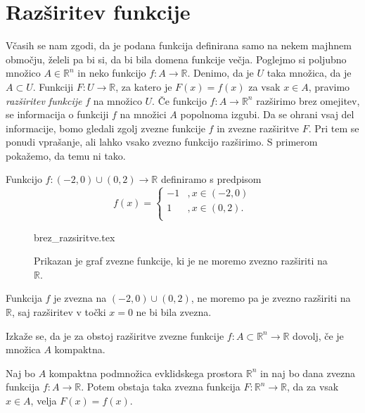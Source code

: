 \documentclass[mat1]{fmfdelo}
\newcommand{\R}{\mathbb R}
\newcommand{\0}{0}
\begin{document}
\section{Razširitev funkcije}\label{raz:siritev}
Včasih se nam zgodi, da je podana funkcija definirana samo na nekem majhnem območju, želeli pa bi si, da bi bila domena funkcije večja. Poglejmo si poljubno množico $A \in \R^n$ in neko funkcijo $f : A \to \R$. Denimo, da je $U$ taka množica, da je $A \subset U$. Funkciji $F : U \to \R$, za katero je $F(x) = f(x)$ za vsak $x \in A$, pravimo \emph{razširitev funkcije} $f$ na množico $U$. Če funkcijo $f : A \to \R^n$ razširimo brez omejitev, se informacija o funkciji $f$ na množici $A$ popolnoma izgubi. Da se ohrani vsaj del informacije, bomo gledali zgolj zvezne funkcije $f$ in zvezne razširitve $F$. Pri tem se ponudi vprašanje, ali lahko vsako zvezno funkcijo razširimo. S primerom pokažemo, da temu ni tako.

\begin{primer}
Funkcijo $f : (-2, 0) \cup (0, 2) \to \R$ definiramo s predpisom
\[  f(x) = \left \{
\begin{array}{ll}
	-1 &, x \in (-2, 0)\\
	1 &, x \in (0, 2). \\
\end{array} 
\right. \]
\begin{figure}[h!]
	\centering
	{brez_razsiritve.tex}
	\caption{Prikazan je graf zvezne funkcije, ki je ne moremo zvezno razširiti na $\R$.}
\end{figure}
Funkcija $f$ je zvezna na $(-2, 0) \cup (0, 2)$, ne moremo pa je zvezno razširiti na $\R$, saj razširitev v točki $x = 0$ ne bi bila zvezna.
\end{primer}

Izkaže se, da je za obstoj razširitve zvezne funkcije $f : A \subset \R^n  \to \R$ dovolj, če je množica $A$ kompaktna.

\begin{lema}\label{lem:razsiritev}
Naj bo $A$ kompaktna podmnožica evklidskega prostora $\R^n$ in naj bo dana zvezna funkcija $f : A \to \R$. Potem obstaja taka zvezna funkcija $F : \R^n \to \R$, da za vsak $x \in A$, velja $F(x) = f(x)$.
\end{lema}
\end{document}
